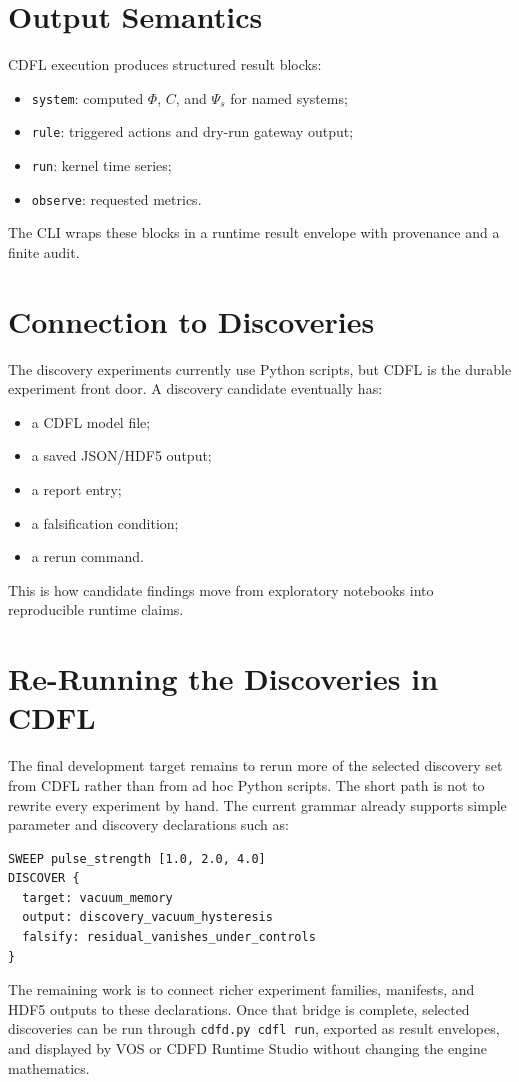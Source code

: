 \documentclass[12pt,a4paper]{article}
\begin{document}
\section{Output Semantics}
CDFL execution produces structured result blocks:
\begin{itemize}
    \item \texttt{system}: computed $\Phi$, $C$, and $\Psi_s$ for named systems;
    \item \texttt{rule}: triggered actions and dry-run gateway output;
    \item \texttt{run}: kernel time series;
    \item \texttt{observe}: requested metrics.
\end{itemize}
The CLI wraps these blocks in a runtime result envelope with provenance and a
finite audit.

\section{Connection to Discoveries}
The discovery experiments currently use Python scripts, but CDFL is the durable
experiment front door. A discovery candidate eventually has:
\begin{itemize}
    \item a CDFL model file;
    \item a saved JSON/HDF5 output;
    \item a report entry;
    \item a falsification condition;
    \item a rerun command.
\end{itemize}
This is how candidate findings move from exploratory notebooks into reproducible
runtime claims.

\section{Re-Running the Discoveries in CDFL}
The final development target remains to rerun more of the selected discovery set
from CDFL rather than from ad hoc Python scripts. The short path is not to
rewrite every experiment by hand. The current grammar already supports simple
parameter and discovery declarations such as:
\begin{verbatim}
SWEEP pulse_strength [1.0, 2.0, 4.0]
DISCOVER {
  target: vacuum_memory
  output: discovery_vacuum_hysteresis
  falsify: residual_vanishes_under_controls
}
\end{verbatim}
The remaining work is to connect richer experiment families, manifests, and HDF5
outputs to these declarations. Once that bridge is complete, selected discoveries
can be run through \texttt{cdfd.py cdfl run}, exported as result envelopes, and
displayed by VOS or CDFD Runtime Studio without changing the engine mathematics.
\end{document}
